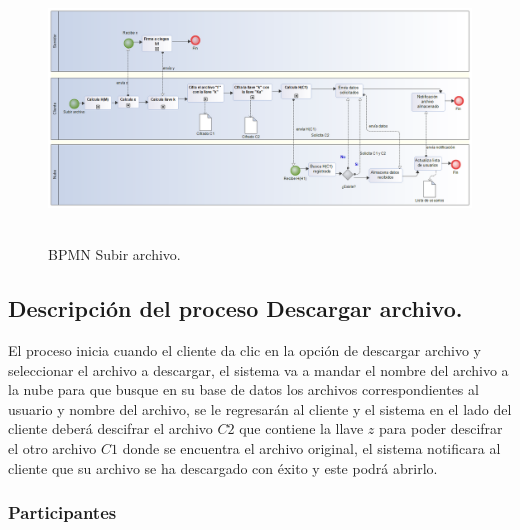 \begin{figure}[H]
\centering
\includegraphics[width=17cm, height=7cm]{./images/BPM_Subir.png}
\caption{BPMN Subir archivo.}

\end{figure}


\subsection{Descripción del proceso Descargar archivo.}

El proceso inicia cuando el cliente da clic en la opción de descargar archivo y seleccionar el archivo a descargar, el sistema va a mandar el nombre del archivo a la nube para que busque en su base de datos los archivos correspondientes al usuario y nombre del archivo, se le regresarán al cliente y el sistema en el lado del cliente deberá descifrar el archivo $C2$ que contiene la llave $z$ para poder descifrar el otro archivo $C1$ donde se encuentra el archivo original, el sistema notificara al cliente que su archivo se ha descargado con éxito y este podrá abrirlo. \\


\subsubsection{Participantes}

